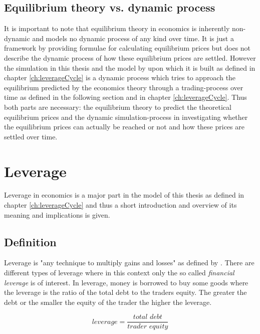 \documentclass[../Bachelorarbeit.tex]{subfiles}
\begin{document}
\subsection{Equilibrium theory vs. dynamic process}
It is important to note that equilibrium theory in economics is inherently non-dynamic and models no dynamic process of any kind over time. It is just a framework by providing formulae for calculating equilibrium prices but does not describe the dynamic process of how these equilibrium prices are settled. However the simulation in this thesis and the model by \cite{Breuer2015} upon which it is built as defined in chapter \ref{ch:leverageCycle} is a dynamic process which tries to approach the equilibrium predicted by the economics theory through a trading-process over time as defined in the following section and in chapter \ref{ch:leverageCycle}.  Thus both parts are necessary: the equilibrium theory to predict the theoretical equilibrium prices and the dynamic simulation-process in investigating whether the equilibrium prices can actually be reached or not and how these prices are settled over time.



\section{Leverage}
Leverage in economics is a major part in the model of this thesis as defined in chapter \ref{ch:leverageCycle} and thus a short introduction and overview of its meaning and implications is given.

\subsection{Definition}

Leverage is "any technique to multiply gains and losses" as defined by \cite{Brigham2012}. There are different types of leverage where in this context only the so called \textit{financial leverage} is of interest. In leverage, money is borrowed to buy some goods where the leverage is the ratio of the total debt to the traders equity. The greater the debt or the smaller the equity of the trader the higher the leverage.

\begin{equation}
leverage = \frac{\textit{total debt}}{\textit{trader equity}}
\end{equation}

\medskip
\end{document}
